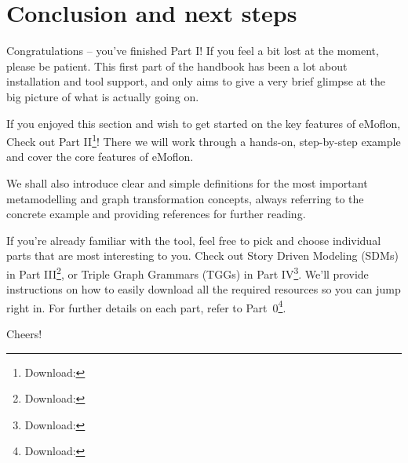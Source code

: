 \newpage
\hypertarget{conclusion}{} 
\section{Conclusion and next steps}
\genHeader

Congratulations -- you've finished Part I! If you feel a bit lost at the moment, please be patient. This first part of the handbook has been a lot about
installation and tool support, and only aims to give a very brief glimpse at the big picture of what is actually going on.

If you enjoyed this section and wish to get started on the key features of eMoflon, Check out Part II\footnote{Download: \dlPartTwo}! There we will work through a hands-on, step-by-step
example and cover the core features of eMoflon.

We shall also introduce clear and simple definitions for the most important metamodelling and graph transformation concepts, always referring to the concrete
example and providing references for further reading.

If you're already familiar with the tool, feel free to pick and choose individual parts that are most interesting to you. Check out Story Driven Modeling (SDMs)
in Part III\footnote{Download: \dlPartThree}, or Triple Graph Grammars (TGGs) in Part IV\footnote{Download: \dlPartFour}. We'll provide instructions on how to easily download all the required resources so you can jump
right in. For further details on each part, refer to Part~0\footnote{Download: \dlPartZero}.

Cheers!
